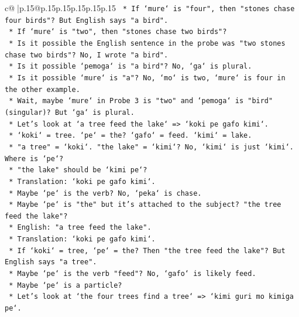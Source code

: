 \documentclass{article}
\begin{document}
{\begin{supertabular}{c@{$\;$}|p{.15\linewidth}@{}p{.15\linewidth}p{.15\linewidth}p{.15\linewidth}p{.15\linewidth}p{.15\linewidth}}
{{{\texttt{                    *   If `mure` is "four", then "stones chase four birds"? But English says "a bird".} \\
\texttt{                    *   If `mure` is "two", then "stones chase two birds"?} \\
\texttt{                    *   Is it possible the English sentence in the probe was "two stones chase two birds"? No, I wrote "a bird".} \\
\texttt{                    *   Is it possible `pemoga` is "a bird"? No, `ga` is plural.} \\
\texttt{                    *   Is it possible `mure` is "a"? No, `mo` is two, `mure` is four in the other example.} \\
\texttt{                    *   Wait, maybe `mure` in Probe 3 is "two" and `pemoga` is "bird" (singular)? But `ga` is plural.} \\
\texttt{                    *   Let's look at `a tree feed the lake` => `koki pe gafo kimi`.} \\
\texttt{                        *   `koki` = tree. `pe` = the? `gafo` = feed. `kimi` = lake.} \\
\texttt{                        *   "a tree" = `koki`. "the lake" = `kimi`? No, `kimi` is just `kimi`. Where is `pe`?} \\
\texttt{                        *   "the lake" should be `kimi pe`?} \\
\texttt{                        *   Translation: `koki pe gafo kimi`.} \\
\texttt{                        *   Maybe `pe` is the verb? No, `peka` is chase.} \\
\texttt{                        *   Maybe `pe` is "the" but it's attached to the subject? "the tree feed the lake"?} \\
\texttt{                        *   English: "a tree feed the lake".} \\
\texttt{                        *   Translation: `koki pe gafo kimi`.} \\
\texttt{                        *   If `koki` = tree, `pe` = the? Then "the tree feed the lake"? But English says "a tree".} \\
\texttt{                        *   Maybe `pe` is the verb "feed"? No, `gafo` is likely feed.} \\
\texttt{                        *   Maybe `pe` is a particle?} \\
\texttt{                        *   Let's look at `the four trees find a tree` => `kimi guri mo kimiga pe`.} \\
}}}
\end{supertabular}}
\end{document}
